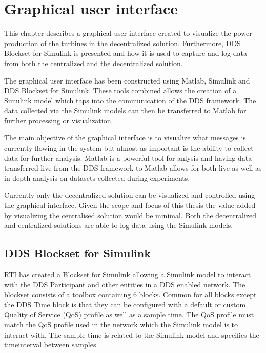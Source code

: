 \chapter{Graphical user interface} \label{sec:graphicalInterface}
This chapter describes a graphical user interface created to visualize the power production of the turbines in the decentralized solution. Furthermore, DDS Blockset for Simulink is presented and how it is used to capture and log data from both the centralized and the decentralized solution.

The graphical user interface has been constructed using Matlab, Simulink and DDS Blockset for Simulink.
These tools combined allows the creation of a Simulink model which taps into the communication of the DDS framework.
The data collected via the Simulink models can then be transferred to Matlab for further processing or visualization.

The main objective of the graphical interface is to visualize what messages is currently flowing in the system but almost as important is the ability to collect data for further analysis.
Matlab is a powerful tool for anlysis and having data transferred live from the DDS framework to Matlab allows for both live as well as in depth analysis on datasets collected during experiments.

Currently only the decentralized solution can be visualized and controlled using the graphical interface. Given the scope and focus of this thesis the value added by visualizing the centralised solution would be minimal. Both the decentralized and centralized solutions are able to log data using the Simulink models.

\section{DDS Blockset for Simulink}
RTI has created a Blockset for Simulink allowing a Simulink model to interact with the DDS Participant and other entities in a DDS enabled network.
The blockset consists of a toolbox containing 6 blocks. Common for all blocks except the DDS Time block is that they can be configured with a default or custom Quality of Service (QoS) profile as well as a sample time. The QoS profile must match the QoS profile used in the network which the Simulink model is to interact with. The sample time is related to the Simulink model and specifies the timeinterval between samples.

